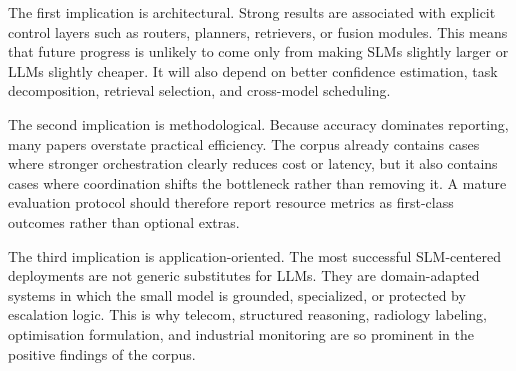 The first implication is architectural. Strong results are associated with explicit control layers such as routers, planners, retrievers, or fusion modules. This means that future progress is unlikely to come only from making SLMs slightly larger or LLMs slightly cheaper. It will also depend on better confidence estimation, task decomposition, retrieval selection, and cross-model scheduling.

The second implication is methodological. Because accuracy dominates reporting, many papers overstate practical efficiency. The corpus already contains cases where stronger orchestration clearly reduces cost or latency, but it also contains cases where coordination shifts the bottleneck rather than removing it. A mature evaluation protocol should therefore report resource metrics as first-class outcomes rather than optional extras.

The third implication is application-oriented. The most successful SLM-centered deployments are not generic substitutes for LLMs. They are domain-adapted systems in which the small model is grounded, specialized, or protected by escalation logic. This is why telecom, structured reasoning, radiology labeling, optimisation formulation, and industrial monitoring are so prominent in the positive findings of the corpus.
